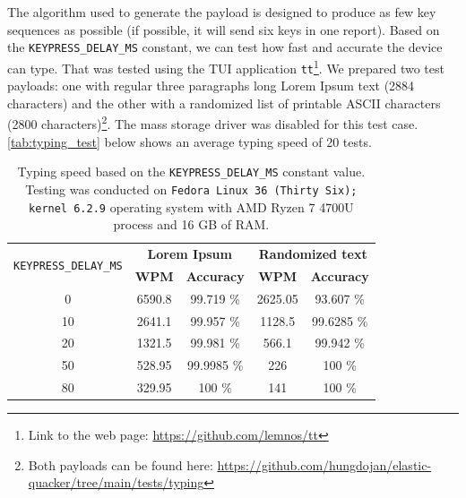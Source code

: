 The algorithm used to generate the payload is designed to produce as few key sequences as possible (if possible, it will send six keys in one report). Based on the \verb|KEYPRESS_DELAY_MS| constant, we can test how fast and accurate the device can type. That was tested using the TUI application \verb|tt|\footnote{Link to the web page: \url{https://github.com/lemnos/tt}}. We prepared two test payloads: one with regular three paragraphs long Lorem Ipsum text (2884 characters) and the other with a randomized list of printable ASCII characters (2800 characters)\footnote{Both payloads can be found here: \url{https://github.com/hungdojan/elastic-quacker/tree/main/tests/typing}}. The mass storage driver was disabled for this test case. \autoref{tab:typing_test} below shows an average typing speed of 20 tests.
\begin{table}[ht]
    \centering
    \begin{tabular}{|c|c|c|c|c|} \hline
        \multirow{2}{*}{\texttt{KEYPRESS\_DELAY\_MS}} & \multicolumn{2}{|c|}{\textbf{Lorem Ipsum}} & \multicolumn{2}{|c|}{\textbf{Randomized text}} \\ \cline{2-5}
                                                      & \textbf{WPM} &           \textbf{Accuracy} & \textbf{WPM} &               \textbf{Accuracy} \\ \hline
                                                    0 &       6590.8 &                   99.719 \% &      2625.05 &                      93.607 \%  \\ \hline
                                                   10 &       2641.1 &                   99.957 \% &       1128.5 &                     99.6285 \%  \\ \hline
                                                   20 &       1321.5 &                   99.981 \% &        566.1 &                      99.942 \%  \\ \hline
                                                   50 &       528.95 &                  99.9985 \% &          226 &                         100 \%  \\ \hline
                                                   80 &       329.95 &                      100 \% &          141 &                         100 \%  \\ \hline
    \end{tabular}
    \caption{Typing speed based on the \texttt{KEYPRESS\_DELAY\_MS} constant value. Testing was conducted on \texttt{Fedora Linux 36 (Thirty Six); kernel 6.2.9} operating system with AMD Ryzen 7 4700U process and 16 GB of RAM.}
    \label{tab:typing_test}
\end{table}
